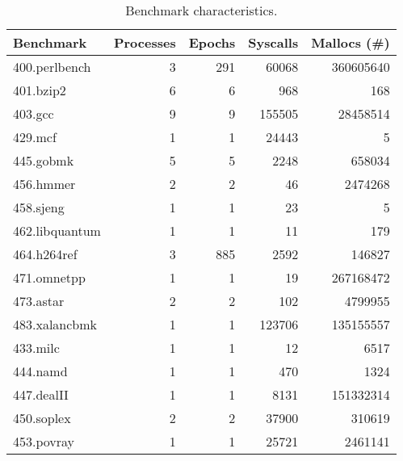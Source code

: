 \begin{table}[!t]
\centering
\begin{tabular}{l|r| r| r|r }
\textbf{Benchmark} & \textbf{Processes} & \textbf{Epochs} & \textbf{Syscalls} & \textbf{Mallocs (\#)} \\
\hline
400.perlbench & 3 & 291 & 60068 & 360605640 \\
401.bzip2 & 6 & 6 & 968 & 168 \\
403.gcc & 9 & 9 & 155505 & 28458514 \\
429.mcf & 1 & 1 & 24443 & 5 \\
445.gobmk & 5 & 5 & 2248 & 658034 \\
456.hmmer & 2 & 2 & 46 & 2474268 \\
458.sjeng & 1 & 1 & 23 & 5 \\
462.libquantum & 1 & 1 & 11 & 179 \\
464.h264ref & 3 & 885 & 2592 & 146827 \\
471.omnetpp & 1 & 1 & 19 & 267168472 \\
473.astar & 2 & 2 & 102 & 4799955 \\
483.xalancbmk & 1 & 1 & 123706 & 135155557 \\
433.milc & 1 & 1 & 12 & 6517 \\
444.namd & 1 & 1 & 470 & 1324 \\
447.dealII & 1 & 1 & 8131 & 151332314 \\
450.soplex & 2 & 2 & 37900 & 310619 \\
453.povray & 1 & 1 & 25721 & 2461141 \\	
\end{tabular}
\caption{Benchmark characteristics. \label{table:character}}
\end{table}
